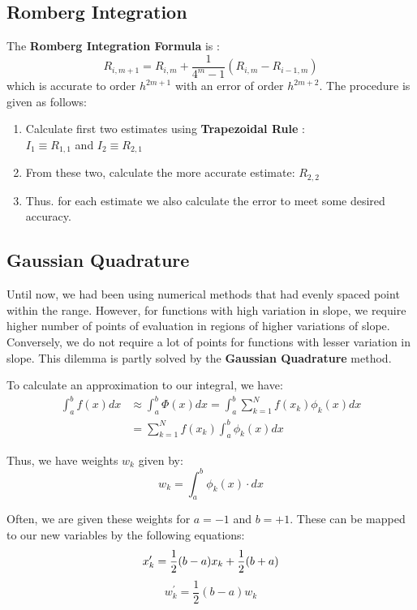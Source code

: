 \subsection{Romberg Integration}
The \textbf{Romberg Integration Formula} is :
\[R_{i,m+1} = R_{i,m} + \dfrac{1}{4^{m}-1}(R_{i,m}-R_{i-1,m}) 
\]
which is accurate to order $h^{2m+1}$ with an error of order $h^{2m+2}$. The procedure is given as follows:
\begin{enumerate}
	\item Calculate first two estimates using \textbf{Trapezoidal Rule} :\\
	 $I_{1}\equiv R_{1,1}$ and $I_{2}\equiv R_{2,1}$
	 \item From these two, calculate the more accurate estimate: $R_{2,2}$
	 \item Thus. for each estimate we also calculate the error to meet some desired accuracy.
	
\end{enumerate}
\begin{center}


\end{center}

\subsection{Gaussian Quadrature}
Until now, we had been using numerical methods that had evenly spaced point within the range. However, for functions with high variation in slope, we require higher number of points of evaluation in regions of higher variations of slope. Conversely, we do not require a lot of points for functions with lesser variation in slope. This dilemma is partly solved by the \textbf{Gaussian Quadrature} method.
\par
To calculate an approximation to our integral, we have:
\[\begin{split}
\int_{a}^{b}f(x)dx&\approx \int_{a}^{b}\Phi(x)dx=\int_{a}^{b}\sum_{k=1}^{N}f(x_{k})\phi_{k}(x)dx\\
&=\sum_{k=1}^{N}f(x_{k})\int_{a}^{b}\phi_{k}(x)dx
\end{split}\]
\par Thus, we have weights $w_k$ given by:
$$w_{k}=\int_{a}^{b}\phi_{k}(x)\cdot dx$$
\par Often, we are given these weights for $a=-1$ and $b=+1$. These can be mapped to our new variables by the following equations:
$$x_{k}^{\prime}=\dfrac{1}{2}(b-a)x_{k}+\dfrac{1}{2}(b+a)\\$$
$$w_{k}^{\prime}=\dfrac{1}{2}(b-a)w_{k}$$
